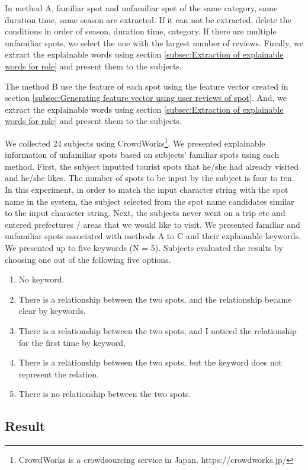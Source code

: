 \documentclass[journal]{IAENGtran}
\begin{document}
In method A, familiar spot and unfamiliar spot of the same category, same duration time, same season are extracted. If it can not be extracted, delete the conditions in order of season, duration time, category.
If there are multiple unfamiliar spots, we select the one with the largest number of reviews.
Finally, we extract the explainable words using section \ref{subsec:Extraction of explainable words for role} and present them to the subjects.

The method B use the feature of each spot using the feature vector created in section \ref{subsec:Generating feature vector using user reviews of spot}.
And, we extract the explainable words using section \ref{subsec:Extraction of explainable words for role} and present them to the subjects.

We collected 24 subjects using CrowdWorks\footnote{CrowdWorks is a crowdsourcing service in Japan. https://crowdworks.jp/}.
We presented explainable information of unfamiliar spots based on subjects' familiar spots using each method.
First, the subject inputted tourist spots that he/she had already visited and he/she likes. The number of spots to be input by the subject is four to ten.
In this experiment, in order to match the input character string with the spot name in the system, the subject selected from the spot name candidates similar to the input character string.
Next, the subjects never went on a trip etc and entered prefectures / areas that we would like to visit.
We presented familiar and unfamiliar spots associated with methods A to C and their explainable keywords.
We presented up to five keywords (N = 5).
Subjects evaluated the results by choosing one out of the following five options.
\begin{enumerate}
  \item No keyword.
  \item There is a relationship between the two spots, and the relationship became clear by keywords.
  \item There is a relationship between the two spots, and I noticed the relationship for the first time by keyword.
  \item There is a relationship between the two spots, but the keyword does not represent the relation.
  \item There is no relationship between the two spots.
\end{enumerate}

\subsection{Result}
\label{subsec:Result}
\end{document}
